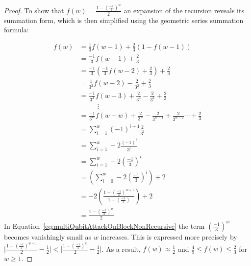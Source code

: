 \begin{proof}
To show that $f(w) = \frac{1-(\frac{-1}{3})^w}{2}$ an expansion of the recursion reveals its summation form, which is then simplified using the geometric series summation formula:

\begin{align}
f(w) &= \frac{1}{3}f(w - 1) + \frac{2}{3}(1 - f(w - 1))\\
&= \frac{-1}{3}f(w - 1) + \frac{2}{3}\\
&= \frac{-1}{3}(\frac{-1}{3}f(w - 2) + \frac{2}{3}) + \frac{2}{3}\\
&= \frac{1}{3^2}f(w - 2) - \frac{2}{3^2} + \frac{2}{3}\\
&= \frac{-1}{3^3}f(w - 3) + \frac{2}{3^3} - \frac{2}{3^2} + \frac{2}{3}\\
&\ \ \ \ \ \ \ \ \ \ \ \ \vdots \\
&= \frac{-1}{3^w}f(w - w) + \frac{2}{3^w} - \frac{2}{3^{w-1}} + \frac{2}{3^{w-2}} \cdots +\frac{2}{3}\\
&= \sum_{i=1} ^{w} (-1)^{i+1} \frac{2}{3^i} \\
&= \sum_{i=1} ^{w} -2 \frac{(-1)^{i}}{3^i} \\
&= \sum_{i=1} ^{w} -2 \left(\frac{-1}{3}\right)^i \\
&= \left(\sum_{i=0} ^{w} -2 \left (\frac{-1}{3}\right)^i\right) + 2 \\
&= -2\left(\frac{1-(\frac{-1}{3})^{w+1}}{1-(\frac{-1}{3})}\right) + 2 \\
&= \frac{1-(\frac{-1}{3})^w}{2}  \label{eq:multiQubitAttackOnBlockNonRecursive}
\end{align}
In Equation~\eqref{eq:multiQubitAttackOnBlockNonRecursive} the term $(\frac{-1}{3})^w$ becomes vanishingly small as $w$ increases. This is expressed more precisely by $\lvert \frac{1-(\frac{-1}{3})^{w+1}}{2} - \frac{1}{2} \rvert < \lvert \frac{1-(\frac{-1}{3})^w}{2} - \frac{1}{2} \rvert$. As a result, $f(w) \approx \frac{1}{2}$ and $\frac{4}{9} \leq f(w) \leq \frac{2}{3}$ for $w \geq 1$.
\end{proof}

